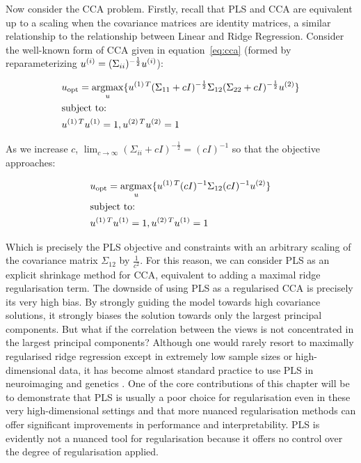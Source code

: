 Now consider the CCA problem.
Firstly, recall that PLS and CCA are equivalent up to a scaling when the covariance matrices are identity matrices, a similar relationship to the relationship between Linear and Ridge Regression.
Consider the well-known form of CCA given in equation~\ref{eq:cca}\citep{mihalik2022canonical} (formed by reparameterizing \(u^{(i)}=(\Sigma_{ii})^{-\frac{1}{2}}u^{(i)}\)):

\begin{align}
    \label{eq:cca}
    & u_{\text{opt}}=\underset{u}{\mathrm{argmax}}\{ u^{(1)\,T}(\Sigma_{11}+ c I)^{-\frac{1}{2}}\Sigma_{12}(\Sigma_{22}+c I)^{-\frac{1}{2}}u^{(2)} \} \\
    & \text{subject to:} \notag \\
    & u^{(1)\,T}u^{(1)}=1, u^{(2)\,T}u^{(2)}=1 \notag
\end{align}

As we increase $c$, $\lim_{c \to \infty} (\Sigma_{ii}+ c I)^{-\frac{1}{2}}= (c I)^{-1}$ so that the objective approaches:

\begin{align}
    & u_{\text{opt}}=\underset{u}{\mathrm{argmax}}\{ u^{(1)\,T}(c I)^{-1}\Sigma_{12}(c I)^{-1}u^{(2)} \} \\
    & \text{subject to:} \notag \\
    & u^{(1)\,T}u^{(1)}=1, u^{(2)\,T}u^{(1)}=1 \notag
\end{align}

Which is precisely the PLS objective and constraints with an arbitrary scaling of the covariance matrix $\Sigma_{12}$ by $\frac{1}{c^2}$.
For this reason, we can consider PLS as an explicit shrinkage method for CCA, equivalent to adding a maximal ridge regularisation term.
The downside of using PLS as a regularised CCA is precisely its very high bias.
By strongly guiding the model towards high covariance solutions, it strongly biases the solution towards only the largest principal components.
But what if the correlation between the views is not concentrated in the largest principal components?
Although one would rarely resort to maximally regularised ridge regression except in extremely low sample sizes or high-dimensional data, it has become almost standard practice to use PLS in neuroimaging and genetics \citep{cruciani2022pls, krishnan2011partial}.
One of the core contributions of this chapter will be to demonstrate that PLS is usually a poor choice for regularisation even in these very high-dimensional settings and that more nuanced regularisation methods can offer significant improvements in performance and interpretability.
PLS is evidently not a nuanced tool for regularisation because it offers no control over the degree of regularisation applied.

